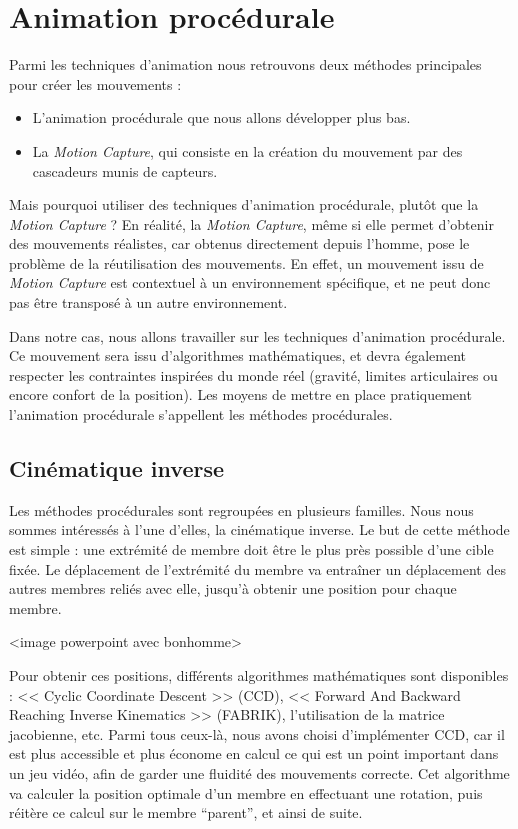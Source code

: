 \documentclass[a4paper,11pt]{article}
\begin{document}
\section{Animation procédurale}  
Parmi les techniques d'animation nous retrouvons deux méthodes principales pour créer les mouvements : 
\begin{itemize}
	\item L'animation procédurale que nous allons développer plus bas.
	\item La \textit{Motion Capture}, qui consiste en la création du mouvement par des cascadeurs munis de capteurs. 
\end{itemize}
Mais pourquoi utiliser des techniques d'animation procédurale, plutôt que la \textit{Motion Capture} ? En réalité, la \textit{Motion Capture}, même si elle permet d'obtenir des mouvements réalistes, car obtenus directement depuis l'homme, pose le problème de la réutilisation des mouvements. En effet, un mouvement issu de \textit{Motion Capture} est contextuel à un environnement spécifique, et ne peut donc pas être transposé à un autre environnement.

Dans notre cas, nous allons travailler sur les techniques d'animation procédurale. Ce mouvement sera issu d'algorithmes mathématiques, et devra également respecter les contraintes inspirées du monde réel (gravité, limites articulaires ou encore confort de la position). Les moyens de mettre en place pratiquement l'animation procédurale s'appellent les méthodes procédurales.

\subsection{Cinématique inverse}
Les méthodes procédurales sont regroupées en plusieurs familles. Nous nous sommes intéressés à l'une d'elles, la cinématique inverse. Le but de cette méthode est simple : une extrémité de membre doit être le plus près possible d'une cible fixée. Le déplacement de l'extrémité du membre va entraîner un déplacement des autres membres reliés avec elle, jusqu'à obtenir une position pour chaque membre.

<image powerpoint avec bonhomme>

Pour obtenir ces positions, différents algorithmes mathématiques sont disponibles : << Cyclic Coordinate Descent >> (CCD), << Forward And Backward Reaching Inverse Kinematics >> (FABRIK), l'utilisation de la matrice jacobienne, etc. Parmi tous ceux-là, nous avons choisi d'implémenter CCD, car il est plus accessible et plus économe en calcul ce qui est un point important dans un jeu vidéo, afin de garder une fluidité des mouvements correcte. Cet algorithme va calculer la position optimale d'un membre en effectuant une rotation, puis réitère ce calcul sur le membre ``parent'', et ainsi de suite.
\end{document}
